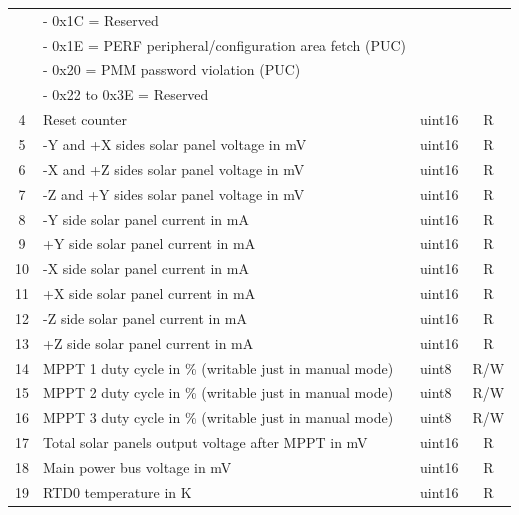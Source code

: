\begin{longtable}[c]{cL{0.72\textwidth}lc}
        & - 0x1C = Reserved                                                 &        &  \\
        & - 0x1E = PERF peripheral/configuration area fetch (PUC)           &        &  \\
        & - 0x20 = PMM password violation (PUC)                             &        &  \\
        & - 0x22 to 0x3E = Reserved                                         &        &  \\
    4   & Reset counter                                                     & uint16 & R \\
    5   & -Y and +X sides solar panel voltage in mV                         & uint16 & R \\
    6   & -X and +Z sides solar panel voltage in mV                         & uint16 & R \\
    7   & -Z and +Y sides solar panel voltage in mV                         & uint16 & R \\
    8   & -Y side solar panel current in mA                                 & uint16 & R \\
    9   & +Y side solar panel current in mA                                 & uint16 & R \\
    10  & -X side solar panel current in mA                                 & uint16 & R \\
    11  & +X side solar panel current in mA                                 & uint16 & R \\
    12  & -Z side solar panel current in mA                                 & uint16 & R \\
    13  & +Z side solar panel current in mA                                 & uint16 & R \\
    14  & MPPT 1 duty cycle in \% (writable just in manual mode)            & uint8  & R/W \\
    15  & MPPT 2 duty cycle in \% (writable just in manual mode)            & uint8  & R/W \\
    16  & MPPT 3 duty cycle in \% (writable just in manual mode)            & uint8  & R/W \\
    17  & Total solar panels output voltage after MPPT in mV                & uint16 & R \\
    18  & Main power bus voltage in mV                                      & uint16 & R \\
    19  & RTD0 temperature in K                                             & uint16 & R \\

\end{longtable}
